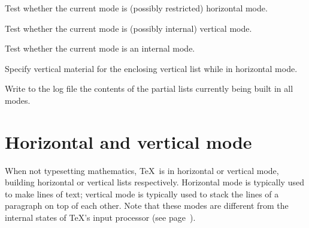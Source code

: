 \documentclass[twoside,letterpaper,openright]{rapport3}
\begin{document}
\label{cschap:vadjust}\label{cschap:showlists}
\begin{inventory}
\item [\cs{ifhmode}] 
      Test whether the current mode is (possibly restricted) horizontal mode.

\item [\cs{ifvmode}] 
      Test whether the current mode is (possibly internal) vertical mode.

\item [\cs{ifinner}] 
      Test whether the current mode is an internal mode.

\item [\cs{vadjust}] 
      Specify vertical material for the enclosing vertical list
      while in horizontal mode.

\item [\cs{showlists}] 
      Write to the log file the contents of the partial lists 
      currently being built in all modes.
\end{inventory}

\section{Horizontal and vertical mode}

When not typesetting mathematics, \TeX\ is in horizontal
or vertical mode, building horizontal or vertical lists
respectively. Horizontal mode is typically used to
make lines of text; vertical mode is typically used
to stack the lines of a paragraph on top of each other.
Note that
these modes
are different from the internal states of \TeX's input processor
(see page~\pageref{input:states}).
\end{document}
